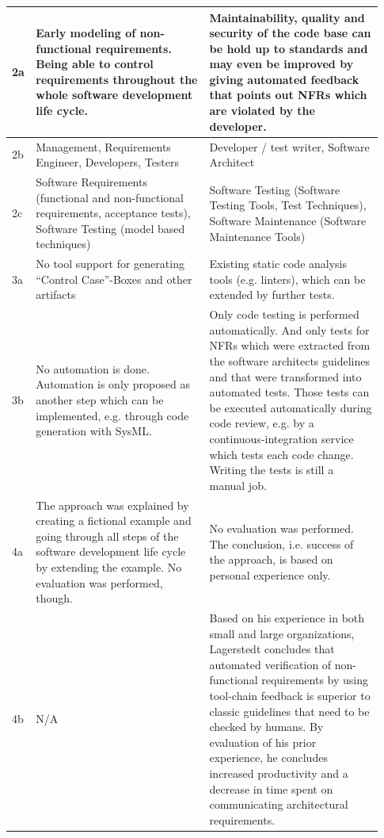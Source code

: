 \begin{small}
\begin{longtable}[h]{p{0.02\linewidth}|p{0.455\linewidth}|p{0.455\linewidth}}
	2a & 
	
	Early modeling of non-functional requirements. Being able to control requirements throughout the whole software development life cycle.
	
	&
	Maintainability, quality and security of the code base can be hold up to standards and may even be improved by giving automated feedback that points out NFRs which are violated by the developer.
	
	\\
	\hline
	2b & 
	Management, Requirements Engineer, Developers, Testers
	&
	Developer / test writer, Software Architect
	\\
	\hline
	
	2c &
	Software Requirements (functional and non-functional requirements, acceptance tests), Software Testing (model based techniques)
	&
	Software Testing (Software Testing Tools, Test Techniques), Software Maintenance (Software Maintenance Tools) \\
	\hline
	3a & 
	No tool support for generating \enquote{Control Case}-Boxes and other artifacts &
	Existing static code analysis tools (e.g. linters), which can be extended by further tests.
	\\
	3b & 
	No automation is done. Automation is only proposed as another step which can be implemented, e.g. through code generation with SysML.
	&
	Only code testing is performed automatically.
	And only tests for NFRs which were extracted from the software architects guidelines and that were transformed into automated tests.
	Those tests can be executed automatically during code review, e.g. by a continuous-integration service which tests each code change. Writing the tests is still a manual job.
	\\
	\hline
	4a
	&
	The approach was explained by creating a fictional example and going through all steps of the software development life cycle by extending the example. No evaluation was performed, though.
	
	&
	No evaluation was performed. The conclusion, i.e. success of the approach, is based on personal experience only.
	\\
	\hline
	4b &
	N/A &
	
	Based on his experience in both small and large organizations, Lagerstedt concludes that automated verification of non-functional requirements by using tool-chain feedback is superior to classic guidelines that need to be checked by humans. By evaluation of his prior experience, he concludes increased productivity and a decrease in time spent on communicating architectural requirements. \\
	\hline
\end{longtable}
\end{small}

